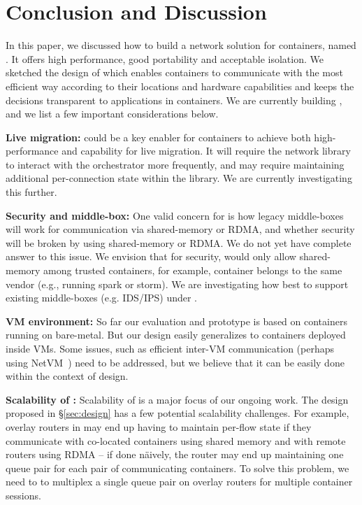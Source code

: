 \section{Conclusion and Discussion} \label{sec:discussion}

In this paper, we discussed how to build a network solution for containers,
named \sysname. It offers high performance, good portability and acceptable
isolation. We sketched the design of \sysname which enables containers to
communicate with the most efficient way according to their locations and
hardware capabilities and keeps the decisions transparent to applications in
containers. We are currently building \sysname, and we list a few important
considerations below.

\textbf{Live migration:} 
\sysname could be a key enabler
for containers to achieve both high-performance and capability for live
migration. It will require the network library to interact with the orchestrator
more frequently, and may require maintaining additional per-connection state
within the library. We are currently investigating this further.

\textbf{Security and middle-box:} One valid concern for \sysname is how legacy
middle-boxes will work for communication via shared-memory or RDMA, and whether
security will be broken by using shared-memory or RDMA.  We do not yet have
complete answer to this issue. We envision that for security, \sysname would
only allow shared-memory among trusted containers, for example, container
belongs to the same vendor (e.g., running spark or storm).  We are investigating
how best to support existing middle-boxes (e.g. IDS/IPS) under \sysname.


\textbf{VM environment:}
So far our evaluation and prototype is based on containers running on
bare-metal.  But our design easily generalizes to containers deployed inside
VMs. Some issues, such as efficient inter-VM communication (perhaps using
NetVM~\cite{netvm}) need to be addressed, but we believe that it can be easily
done within the context of \sysname design.


\textbf{Scalability of \sysname :}
Scalability of \sysname is a major focus of our ongoing work. The design proposed
in \S\ref{sec:design} has a few potential scalability challenges. For example,
overlay routers in \sysname may end up having to maintain per-flow state if
they communicate with co-located containers using shared memory and with remote
routers using RDMA -- if done n\"{a}ively, the router may end up maintaining
one queue pair for each pair of communicating containers.  To solve this
problem, we need to to multiplex a single queue pair on overlay routers for
multiple container sessions.



